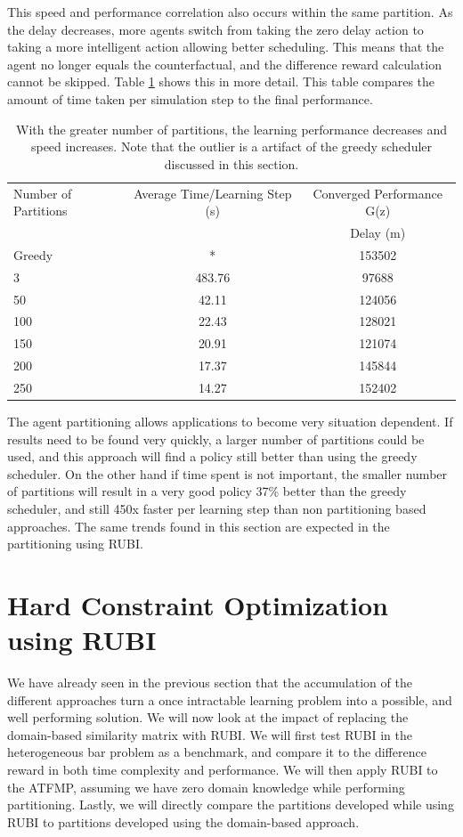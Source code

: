 \documentclass[onehalf,11pt]{beavtex}
\begin{document}
This speed and performance correlation also occurs within the same partition. As the delay decreases, more agents switch from taking the zero delay action to taking a more intelligent action allowing better scheduling. This means that the agent no longer equals the counterfactual, and the difference reward calculation cannot be skipped. Table \ref{ATFMPOldTable} shows this in more detail. This table compares the amount of time taken per simulation step to the final performance.

\begin{table}
\begin{tabular}{|l|c|c|}
\hline
Number of Partitions & Average Time/Learning Step (s) & Converged Performance G(z)\\
&  & Delay (m) \\
\hline
Greedy & * & 153502 \\
\hline
3 & 483.76 & 97688 \\
\hline
50 & 42.11 & 124056 \\
\hline
100 & 22.43 & 128021 \\
\hline
150 & 20.91 & 121074 \\
\hline
200 & 17.37 & 145844\\
\hline
250 & 14.27 & 152402 \\
\hline
\end{tabular}
\caption{With the greater number of partitions, the learning performance decreases and speed increases. Note that the outlier is a artifact of the greedy scheduler discussed in this section.}
\label{ATFMPOldTable}
\end{table}

The agent partitioning allows applications to become very situation dependent. If results need to be found very quickly, a larger number of partitions could be used, and this approach will find a policy still better than using the greedy scheduler. On the other hand if time spent is not important, the smaller number of partitions will result in a very good policy 37\% better than the greedy scheduler, and still 450x faster per learning step than non partitioning based approaches. The same trends found in this section are expected in the partitioning using RUBI.

\section{Hard Constraint Optimization using RUBI}

We have already seen in the previous section that the accumulation of the different approaches turn a once intractable learning problem into a possible, and well performing solution. We will now look at the impact of replacing the domain-based similarity matrix with RUBI. We will first test RUBI in the heterogeneous bar problem as a benchmark, and compare it to the difference reward in both time complexity and performance. We will then apply RUBI to the ATFMP, assuming we have zero domain knowledge while performing partitioning. Lastly, we will directly compare the partitions developed while using RUBI to partitions developed using the domain-based approach. 
\end{document}
